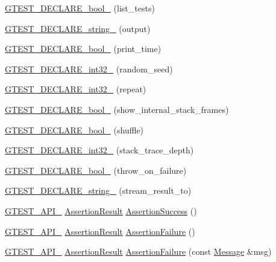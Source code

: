 \begin{DoxyCompactItemize}
\item 
\hyperlink{namespacetesting_af2cd3595c571ca408afc337bc4bb2619}{G\+T\+E\+S\+T\+\_\+\+D\+E\+C\+L\+A\+R\+E\+\_\+bool\+\_\+} (list\+\_\+tests)
\item 
\hyperlink{namespacetesting_a3fe54dd551f1c36cfdd1b36cd6881a44}{G\+T\+E\+S\+T\+\_\+\+D\+E\+C\+L\+A\+R\+E\+\_\+string\+\_\+} (output)
\item 
\hyperlink{namespacetesting_aeccefd463a0942da24750e1bbee76041}{G\+T\+E\+S\+T\+\_\+\+D\+E\+C\+L\+A\+R\+E\+\_\+bool\+\_\+} (print\+\_\+time)
\item 
\hyperlink{namespacetesting_ae754999b59509808254d39e3a3cf38e0}{G\+T\+E\+S\+T\+\_\+\+D\+E\+C\+L\+A\+R\+E\+\_\+int32\+\_\+} (random\+\_\+seed)
\item 
\hyperlink{namespacetesting_a315ef0647e4f2795bf1705de8e9c9659}{G\+T\+E\+S\+T\+\_\+\+D\+E\+C\+L\+A\+R\+E\+\_\+int32\+\_\+} (repeat)
\item 
\hyperlink{namespacetesting_af37b9206b938bb8b7d398a1379eb7482}{G\+T\+E\+S\+T\+\_\+\+D\+E\+C\+L\+A\+R\+E\+\_\+bool\+\_\+} (show\+\_\+internal\+\_\+stack\+\_\+frames)
\item 
\hyperlink{namespacetesting_a6d87f7374e105483905a305328856f4b}{G\+T\+E\+S\+T\+\_\+\+D\+E\+C\+L\+A\+R\+E\+\_\+bool\+\_\+} (shuffle)
\item 
\hyperlink{namespacetesting_adba6f8afa0f8695956d0134f1629a10b}{G\+T\+E\+S\+T\+\_\+\+D\+E\+C\+L\+A\+R\+E\+\_\+int32\+\_\+} (stack\+\_\+trace\+\_\+depth)
\item 
\hyperlink{namespacetesting_ac69f2aeeb84dc5f49bd3d040a6f32d17}{G\+T\+E\+S\+T\+\_\+\+D\+E\+C\+L\+A\+R\+E\+\_\+bool\+\_\+} (throw\+\_\+on\+\_\+failure)
\item 
\hyperlink{namespacetesting_ad4d1ea63037fc21018dbe997cb0041d1}{G\+T\+E\+S\+T\+\_\+\+D\+E\+C\+L\+A\+R\+E\+\_\+string\+\_\+} (stream\+\_\+result\+\_\+to)
\item 
\hyperlink{gtest-port_8h_aa73be6f0ba4a7456180a94904ce17790}{G\+T\+E\+S\+T\+\_\+\+A\+P\+I\+\_\+} \hyperlink{classtesting_1_1_assertion_result}{Assertion\+Result} \hyperlink{namespacetesting_a74a3d26c1286bd4d7c189c5dff2483ab}{Assertion\+Success} ()
\item 
\hyperlink{gtest-port_8h_aa73be6f0ba4a7456180a94904ce17790}{G\+T\+E\+S\+T\+\_\+\+A\+P\+I\+\_\+} \hyperlink{classtesting_1_1_assertion_result}{Assertion\+Result} \hyperlink{namespacetesting_a8d91083190a5914bfe8c5666e2dbca9b}{Assertion\+Failure} ()
\item 
\hyperlink{gtest-port_8h_aa73be6f0ba4a7456180a94904ce17790}{G\+T\+E\+S\+T\+\_\+\+A\+P\+I\+\_\+} \hyperlink{classtesting_1_1_assertion_result}{Assertion\+Result} \hyperlink{namespacetesting_aed37b5c1db949665e4022cb4740d86c2}{Assertion\+Failure} (const \hyperlink{classtesting_1_1_message}{Message} \&msg)

\end{DoxyCompactItemize}
